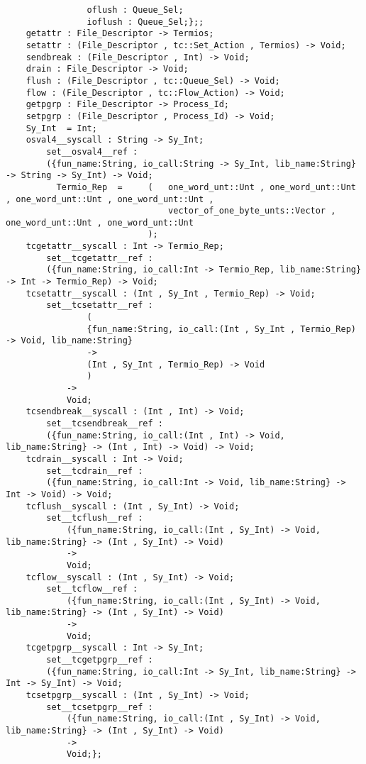 \begin{verbatim}
                oflush : Queue_Sel;
                ioflush : Queue_Sel;};;
    getattr : File_Descriptor -> Termios;
    setattr : (File_Descriptor , tc::Set_Action , Termios) -> Void;
    sendbreak : (File_Descriptor , Int) -> Void;
    drain : File_Descriptor -> Void;
    flush : (File_Descriptor , tc::Queue_Sel) -> Void;
    flow : (File_Descriptor , tc::Flow_Action) -> Void;
    getpgrp : File_Descriptor -> Process_Id;
    setpgrp : (File_Descriptor , Process_Id) -> Void;
    Sy_Int  = Int;
    osval4__syscall : String -> Sy_Int;
        set__osval4__ref :
        ({fun_name:String, io_call:String -> Sy_Int, lib_name:String} -> String -> Sy_Int) -> Void;
          Termio_Rep  =     (   one_word_unt::Unt , one_word_unt::Unt , one_word_unt::Unt , one_word_unt::Unt ,
                                vector_of_one_byte_unts::Vector , one_word_unt::Unt , one_word_unt::Unt
                            );
    tcgetattr__syscall : Int -> Termio_Rep;
        set__tcgetattr__ref :
        ({fun_name:String, io_call:Int -> Termio_Rep, lib_name:String} -> Int -> Termio_Rep) -> Void;
    tcsetattr__syscall : (Int , Sy_Int , Termio_Rep) -> Void;
        set__tcsetattr__ref :
                (
                {fun_name:String, io_call:(Int , Sy_Int , Termio_Rep) -> Void, lib_name:String}
                ->
                (Int , Sy_Int , Termio_Rep) -> Void
                )
            ->
            Void;
    tcsendbreak__syscall : (Int , Int) -> Void;
        set__tcsendbreak__ref :
        ({fun_name:String, io_call:(Int , Int) -> Void, lib_name:String} -> (Int , Int) -> Void) -> Void;
    tcdrain__syscall : Int -> Void;
        set__tcdrain__ref :
        ({fun_name:String, io_call:Int -> Void, lib_name:String} -> Int -> Void) -> Void;
    tcflush__syscall : (Int , Sy_Int) -> Void;
        set__tcflush__ref :
            ({fun_name:String, io_call:(Int , Sy_Int) -> Void, lib_name:String} -> (Int , Sy_Int) -> Void)
            ->
            Void;
    tcflow__syscall : (Int , Sy_Int) -> Void;
        set__tcflow__ref :
            ({fun_name:String, io_call:(Int , Sy_Int) -> Void, lib_name:String} -> (Int , Sy_Int) -> Void)
            ->
            Void;
    tcgetpgrp__syscall : Int -> Sy_Int;
        set__tcgetpgrp__ref :
        ({fun_name:String, io_call:Int -> Sy_Int, lib_name:String} -> Int -> Sy_Int) -> Void;
    tcsetpgrp__syscall : (Int , Sy_Int) -> Void;
        set__tcsetpgrp__ref :
            ({fun_name:String, io_call:(Int , Sy_Int) -> Void, lib_name:String} -> (Int , Sy_Int) -> Void)
            ->
            Void;};
\end{verbatim}
